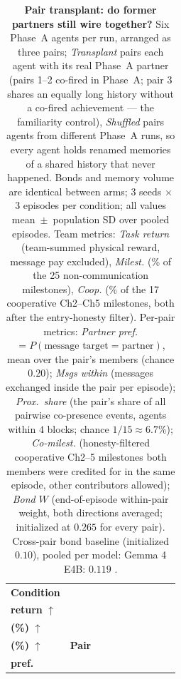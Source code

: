 \begin{table}[t]
\centering
\caption{\textbf{Pair transplant: do former partners still wire together?} Six Phase~A agents per run, arranged as three pairs; \emph{Transplant} pairs each agent with its real Phase~A partner (pairs 1--2 co-fired in Phase~A; pair 3 shares an equally long history without a co-fired achievement — the familiarity control), \emph{Shuffled} pairs agents from different Phase~A runs, so every agent holds renamed memories of a shared history that never happened. Bonds and memory volume are identical between arms; 3 seeds $\times$ 3 episodes per condition; all values mean~$\pm$~population SD over pooled episodes. Team metrics: \emph{Task return} (team-summed physical reward, message pay excluded), \emph{Milest.} (\% of the 25 non-communication milestones), \emph{Coop.} (\% of the 17 cooperative Ch2--Ch5 milestones, both after the entry-honesty filter). Per-pair metrics: \emph{Partner pref.} $=P(\text{message target}=\text{partner})$, mean over the pair's members (chance $0.20$); \emph{Msgs within} (messages exchanged inside the pair per episode); \emph{Prox.\ share} (the pair's share of all pairwise co-presence events, agents within $4$ blocks; chance $1/15\approx6.7\%$); \emph{Co-milest.} (honesty-filtered cooperative Ch2--5 milestones both members were credited for in the same episode, other contributors allowed); \emph{Bond $W$} (end-of-episode within-pair weight, both directions averaged; initialized at $0.265$ for every pair). Cross-pair bond baseline (initialized $0.10$), pooled per model: Gemma 4 E4B: $0.119$ .}
\label{tab:transplant_main}
\small
\setlength{\tabcolsep}{4.0pt}
\renewcommand{\arraystretch}{1.2}
\begin{tabular}{l ccc l ccccc}
\toprule
\textbf{Condition}
& \makecell{\textbf{Task}\\\textbf{return} $\uparrow$}
& \makecell{\textbf{Milest.}\\\textbf{(\%)} $\uparrow$}
& \makecell{\textbf{Coop.}\\\textbf{(\%)} $\uparrow$}
& \textbf{Pair}
& \makecell{\textbf{Partner}\\\textbf{pref.}}

\end{tabular}
\end{table}
